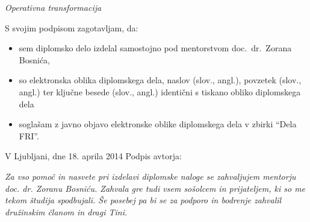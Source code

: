\documentclass[a4paper, 12pt, twoside]{book}
\newcommand{\clearemptydoublepage}{\newpage{\pagestyle{empty}\cleardoublepage}} %
\begin{document}
\vspace{0.5cm}
{\large \emph{Operativna transformacija}}

\vspace{1.5cm}
\noindent S svojim podpisom zagotavljam, da:
\begin{itemize}
	\item sem diplomsko delo izdelal samostojno pod mentorstvom doc.\ dr.\ Zorana Bosnića,
	\item so elektronska oblika diplomskega dela, naslov (slov., angl.), povzetek (slov., angl.) ter ključne besede (slov., angl.) identični s tiskano obliko diplomskega dela
	\item soglašam z javno objavo elektronske oblike diplomskega dela v zbirki “Dela FRI”.
\end{itemize}

\vspace{1cm}
\noindent V Ljubljani, dne 18. aprila 2014 \hfill Podpis avtorja:

\clearemptydoublepage

\thispagestyle{empty}\mbox{}\vfill\null\it%
Za vso pomoč in nasvete pri izdelavi diplomske naloge se zahvaljujem mentorju doc. dr. Zoranu Bosniću. Zahvala gre tudi vsem sošolcem in prijateljem, ki so me tekom študija spodbujali. Še posebej pa bi se za podporo in bodrenje zahvalil družinskim članom in dragi Tini. \rm\normalfont

\clearemptydoublepage

\def\thepage{} %
\tableofcontents{}

\end{document}
